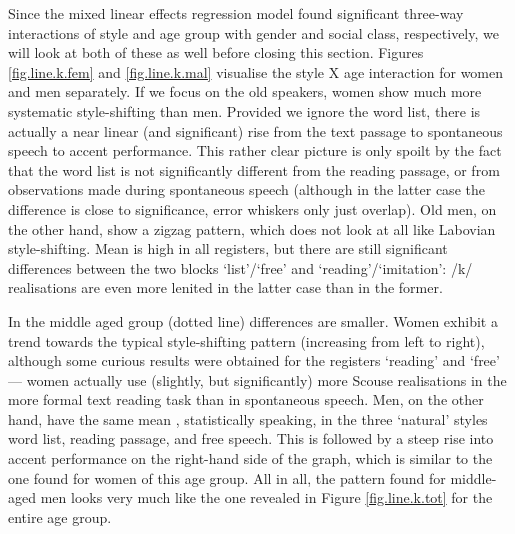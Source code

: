 Since the mixed linear effects regression model found significant three-way interactions of style and age group with gender and social class, respectively, we will look at both of these as well before closing this section.
Figures \ref{fig.line.k.fem} and \ref{fig.line.k.mal} visualise the style X age interaction for women and men separately.
If we focus on the old speakers, women show much more systematic style-shifting than men.
Provided we ignore the word list, there is actually a near linear (and significant) rise from the text passage to spontaneous speech to accent performance.
This rather clear picture is only spoilt by the fact that the word list is not significantly different from the reading passage, or from observations made during spontaneous speech (although in the latter case the difference is close to significance, error whiskers only just overlap).
Old men, on the other hand, show a zigzag pattern, which does not look at all like Labovian style-shifting.
Mean  is high in all registers, but there are still significant differences between the two blocks `list'/`free' and `reading'/`imitation': /k/ realisations are even more lenited in the latter case than in the former.

In the middle aged group (dotted line) differences are smaller.
Women exhibit a trend towards the typical style-shifting pattern (increasing  from left to right), although some curious results were obtained for the registers `reading' and `free' --- women actually use (slightly, but significantly) more Scouse realisations in the more formal text reading task than in spontaneous speech.
Men, on the other hand, have the same mean , statistically speaking, in the three `natural' styles word list, reading passage, and free speech.
This is followed by a steep rise into accent performance on the right-hand side of the graph, which is similar to the one found for women of this age group.
All in all, the pattern found for middle-aged men looks very much like the one revealed in Figure \ref{fig.line.k.tot} for the entire age group.

